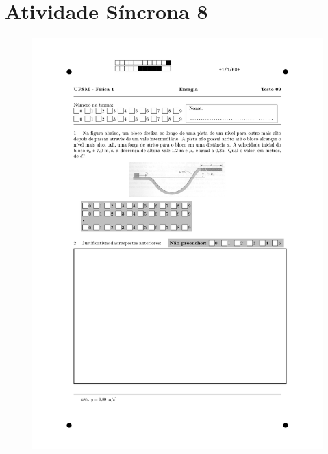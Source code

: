 \section{Atividade Síncrona 8} \label{ch:orp1e8}
\vspace*{\fill}
\begin{figure}[H]\centering
\includegraphics[scale=0.7]{fig/orp1q8_page-0001.jpg}
\end{figure}
\vspace*{\fill}
